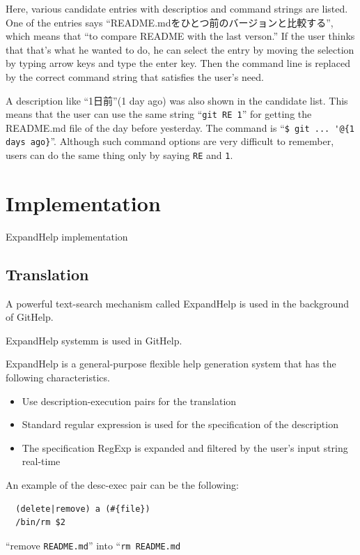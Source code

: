 \documentclass{sigchi}
\def\GH{\textsf{GitHelp}}
\def\EH{\textsf{ExpandHelp}}
\begin{document}
Here, various candidate entries with
descriptios and command strings are listed.
One of the entries says ``README.mdをひとつ前のバージョンと比較する'',
which means that ``to compare README with the last verson.''
%
If the user thinks that that's what he wanted to do,
he can select the entry by moving the selection by typing arrow keys
and type the enter key.
Then the command line is replaced by the correct command string
that satisfies the user's need.

A description like ``1日前''(1 day ago) was also shown in the candidate list.
This means that the user can use the same string ``\texttt{git RE 1}''
for getting the README.md file of the day before yesterday.
The command is ``\verb|$ git ... '@{1 days ago}|''.
Although such command options are very difficult to remember,
users can do the same thing only by saying \texttt{RE} and \texttt{1}.


\section{Implementation}

{\EH} implementation

\subsection{Translation}

A powerful text-search mechanism called {\EH} is used in the
background of {\GH}.

{\EH} systemm is used in {\GH}.

{\EH} is a general-purpose flexible help generation system
that has the following characteristics.

\begin{itemize}
\item Use description-execution pairs for the translation
\item Standard regular expression is used for the specification of the description
\item The specification RegExp is expanded and filtered by the user's input string
  real-time
\end{itemize}

An example of the desc-exec pair can be the following:

\begin{verbatim}
  (delete|remove) a (#{file})
  /bin/rm $2
\end{verbatim}

``remove \verb|README.md|''
into
``\verb|rm README.md|
\end{document}
